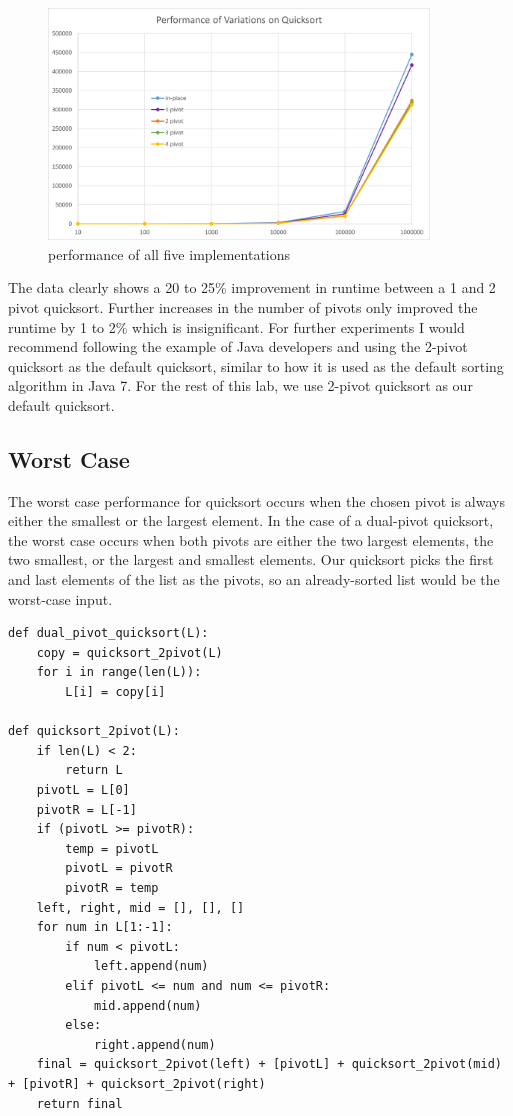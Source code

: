 \documentclass[12pt]{article}
\begin{document}
\begin{figure}[H]
\centering
\includegraphics[width=0.9\textwidth,height=\textheight,keepaspectratio]{multi_pivot}
\caption{performance of all five implementations}
\label{Figure: m1}
\end{figure}

The data clearly shows a 20 to 25\% improvement in runtime between a 1 and 2 pivot quicksort. Further increases in the number of pivots only improved the runtime by 1 to 2\% which is insignificant. For further experiments I would recommend following the example of Java developers and using the 2-pivot quicksort as the default quicksort, similar to how it is used as the default sorting algorithm in Java 7. For the rest of this lab, we use 2-pivot quicksort as our default quicksort.

\subsection{Worst Case}
The worst case performance for quicksort occurs when the chosen pivot is always either the smallest or the largest element. In the case of a dual-pivot quicksort, the worst case occurs when both pivots are either the two largest elements, the two smallest, or the largest and smallest elements. Our quicksort picks the first and last elements of the list as the pivots, so an already-sorted list would be the worst-case input. 

\footnotesize
\begin{verbatim}
def dual_pivot_quicksort(L):
    copy = quicksort_2pivot(L)
    for i in range(len(L)):
        L[i] = copy[i]

def quicksort_2pivot(L):
    if len(L) < 2:
        return L
    pivotL = L[0]
    pivotR = L[-1]
    if (pivotL >= pivotR):
        temp = pivotL
        pivotL = pivotR
        pivotR = temp
    left, right, mid = [], [], []
    for num in L[1:-1]:
        if num < pivotL:
            left.append(num)
        elif pivotL <= num and num <= pivotR:
            mid.append(num)
        else:
            right.append(num)
    final = quicksort_2pivot(left) + [pivotL] + quicksort_2pivot(mid) + [pivotR] + quicksort_2pivot(right)
    return final
\end{verbatim}
\normalsize
\end{document}
